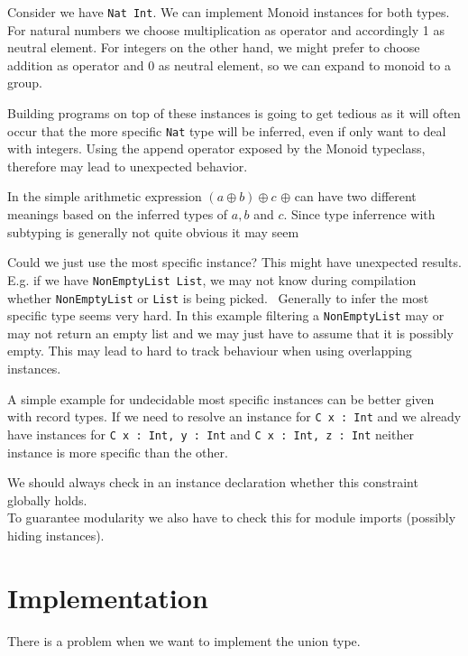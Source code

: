   Consider we have \texttt{Nat \sub Int}.
  We can implement Monoid instances for both types. For natural numbers we choose multiplication as operator and accordingly 1 as neutral element.
  For integers on the other hand, we might prefer to choose addition as operator and 0 as neutral element, so we can expand to monoid to a group.

  Building programs on top of these instances is going to get tedious as it will often occur that the more specific \texttt{Nat} type will be inferred,
  even if only want to deal with integers.
  Using the append operator exposed by the Monoid typeclass, therefore may lead to unexpected behavior.

  In the simple arithmetic expression $(a \oplus b) \oplus c$ $\oplus$ can have two different meanings based on the inferred types of $a,b$ and $c$.
  Since type inferrence with subtyping is generally not quite obvious it may seem 

  Could we just use the most specific instance? This might have unexpected results.
  E.g. if we have \texttt{NonEmptyList \sub List}, we may not know during compilation whether \texttt{NonEmptyList} or \texttt{List} is being picked.
  ~Generally to infer the most specific type seems very hard. In this example filtering a \texttt{NonEmptyList} may or may not return an empty list and we may just have to assume that it is possibly empty.
  This may lead to hard to track behaviour when using overlapping instances.

  A simple example for undecidable most specific instances can be better given with record types.
  If we need to resolve an instance for \texttt{C {x : Int}} and we already have instances for \texttt{C {x : Int, y : Int}} and \texttt{C {x : Int, z : Int}} neither instance is more specific than the other.


  We should always check in an instance declaration whether this constraint globally holds. \\
  To guarantee modularity we also have to check this for module imports (possibly hiding instances).

\section{Implementation}

There is a problem when we want to implement the union type.

